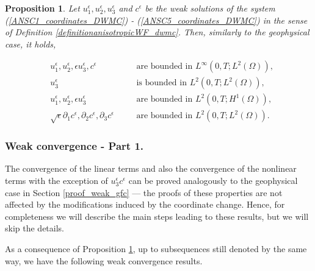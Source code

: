 \documentclass[12pt]{report}
\numberwithin{theorem}{chapter}
\numberwithin{corollary}{chapter}
\numberwithin{lemma}{chapter}
\numberwithin{remark}{chapter}
\numberwithin{definition}{chapter}
\newtheorem{prop}{Proposition}
\numberwithin{prop}{chapter}
\begin{document}
  \begin{prop} \label{aprioriprop}
    Let $u^\epsilon_1, u^\epsilon_2, u^\epsilon_3$ and $c^\epsilon$ be the weak solutions of the system (\ref{ANSC1_coordinates_DWMC}) - (\ref{ANSC5_coordinates_DWMC}) in the sense of Definition \ref{definitionanisotropicWF_dwmc}. Then, similarly to the geophysical case, it holds,
    
    \begin{align}
      & u^\epsilon_1, u^\epsilon_2, \epsilon u^\epsilon_3, c^\epsilon & \quad & \text{are bounded in $L^\infty (0,T; L^2(\Omega)),$} \label{proposition1} \\
      & u^\epsilon_3 & \quad & \text{is bounded in $L^2 (0,T; L^2(\Omega)),$} \label{propositionExtra} \\
      & u^\epsilon_1, u^\epsilon_2, \epsilon u^\epsilon_3 & \quad & \text{are bounded in $L^2(0,T; H^1(\Omega)),$} \label{proposition2} \\
      & \sqrt{\epsilon} \partial_1 c^\epsilon, \partial_2 c^\epsilon, \partial_3 c^\epsilon & \quad & \text{are bounded in $L^2(0,T;L^2(\Omega)).$} \label{proposition3}
    \end{align}
    
  \end{prop}
  
    \subsubsection{Weak convergence - Part 1.}
  
  The convergence of the linear terms and also the convergence of the nonlinear terms with the exception of $u_3^\epsilon c^\epsilon$ can be proved analogously to the geophysical case in Section \ref{proof_weak_gfc} --- the proofs of these properties are not affected by the modifications induced by the coordinate change. Hence, for completeness we will describe the main steps leading to these results, but we will skip the details.
  
  As a consequence of Proposition \ref{aprioriprop}, up to subsequences still denoted by the same way, we have the following weak convergence results.
  
\end{document}

